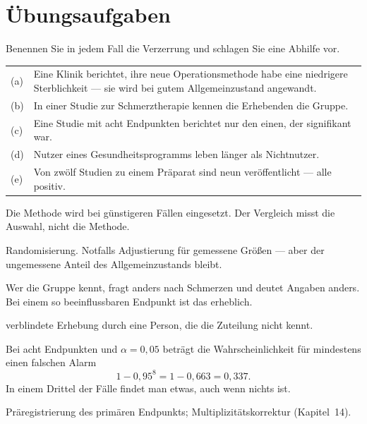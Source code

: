 \section{Übungsaufgaben}

\begin{aufgabe}
Benennen Sie in jedem Fall die Verzerrung und schlagen Sie eine Abhilfe vor.
\begin{center}
{\small
\renewcommand{\arraystretch}{1.4}
\begin{tabular}{@{}P{0.8cm}P{7.6cm}@{}}
\toprule
(a) & Eine Klinik berichtet, ihre neue Operationsmethode habe eine niedrigere Sterblichkeit --- sie wird bei gutem Allgemeinzustand angewandt.\\
(b) & In einer Studie zur Schmerztherapie kennen die Erhebenden die Gruppe.\\
(c) & Eine Studie mit acht Endpunkten berichtet nur den einen, der signifikant war.\\
(d) & Nutzer eines Gesundheitsprogramms leben länger als Nichtnutzer.\\
(e) & Von zwölf Studien zu einem Präparat sind neun veröffentlicht --- alle positiv.\\
\bottomrule
\end{tabular}}
\end{center}

\loesung
{}
Die Methode wird bei günstigeren Fällen eingesetzt. Der Vergleich misst die Auswahl, nicht die Methode.

 Randomisierung. Notfalls Adjustierung für gemessene Größen --- aber der ungemessene Anteil des Allgemeinzustands bleibt.

Wer die Gruppe kennt, fragt anders nach Schmerzen und deutet Angaben anders. Bei einem so beeinflussbaren Endpunkt ist das erheblich.

 verblindete Erhebung durch eine Person, die die Zuteilung nicht kennt.

Bei acht Endpunkten und $\alpha = 0{,}05$ beträgt die Wahrscheinlichkeit für mindestens einen falschen Alarm
\[ 1 - 0{,}95^8 = 1 - 0{,}663 = 0{,}337 . \]
In einem Drittel der Fälle findet man etwas, auch wenn nichts ist.

 Präregistrierung des primären Endpunkts; Multiplizitätskorrektur (Kapitel~14).


\end{aufgabe}
